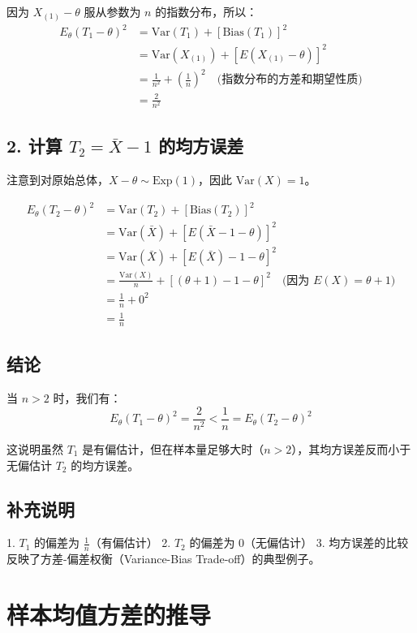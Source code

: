 \documentclass[UTF8]{report}
\theoremstyle{MyLineTheoremStyle} %
\theoremstyle{MyBlockTheoremStyle} %
\theoremstyle{MySubsubsectionStyle} %
\begin{document}
因为 $X_{(1)}-\theta$ 服从参数为 $n$ 的指数分布，所以：
\begin{align*}
E_\theta(T_1-\theta)^2 &= \text{Var}(T_1) + [\text{Bias}(T_1)]^2 \\
&= \text{Var}(X_{(1)}) + [E(X_{(1)}-\theta)]^2 \\
&= \frac{1}{n^2} + (\frac{1}{n})^2 \quad \text{(指数分布的方差和期望性质)} \\
&= \frac{2}{n^2}
\end{align*}

\subsection*{2. 计算 $T_2 = \bar{X} - 1$ 的均方误差}

注意到对原始总体，$X-\theta \sim \text{Exp}(1)$，因此 $\text{Var}(X) = 1$。

\begin{align*}
E_\theta(T_2-\theta)^2 &= \text{Var}(T_2) + [\text{Bias}(T_2)]^2 \\
&= \text{Var}(\bar{X}) + [E(\bar{X}-1-\theta)]^2 \\
&= \text{Var}(\bar{X}) + [E(\bar{X})-1-\theta]^2 \\
&= \frac{\text{Var}(X)}{n} + [(\theta+1)-1-\theta]^2 \quad \text{(因为 }E(X)=\theta+1\text{)} \\
&= \frac{1}{n} + 0^2 \\
&= \frac{1}{n}
\end{align*}

\subsection*{结论}
当 $n > 2$ 时，我们有：
$$
E_\theta(T_1-\theta)^2 = \frac{2}{n^2} < \frac{1}{n} = E_\theta(T_2-\theta)^2
$$

这说明虽然 $T_1$ 是有偏估计，但在样本量足够大时（$n > 2$），其均方误差反而小于无偏估计 $T_2$ 的均方误差。

\subsection*{补充说明}
1. $T_1$ 的偏差为 $\frac{1}{n}$（有偏估计）
2. $T_2$ 的偏差为 0（无偏估计）
3. 均方误差的比较反映了方差-偏差权衡（Variance-Bias Trade-off）的典型例子。


\section*{样本均值方差的推导}
\end{document}
